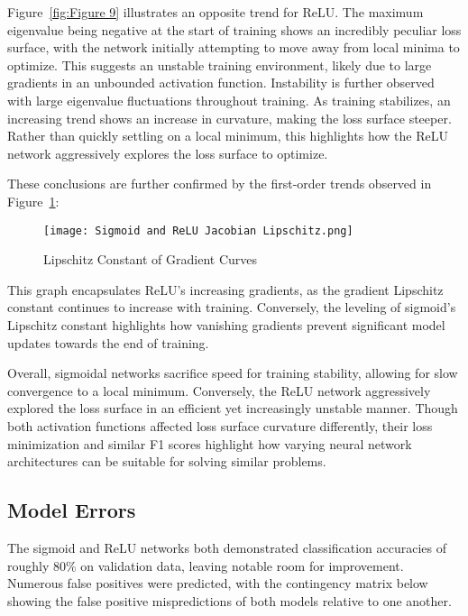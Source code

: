 \documentclass{article}
\theoremstyle{definition}
\begin{document}
Figure~\ref{fig:Figure 9} illustrates an opposite trend for ReLU. The maximum eigenvalue being negative at the start of training shows an incredibly peculiar loss surface, with the network initially attempting to move away from local minima to optimize. This suggests an unstable training environment, likely due to large gradients in an unbounded activation function. Instability is further observed with large eigenvalue fluctuations throughout training. As training stabilizes, an increasing trend shows an increase in curvature, making the loss surface steeper. Rather than quickly settling on a local minimum, this highlights how the ReLU network aggressively explores the loss surface to optimize. 

These conclusions are further confirmed by the first-order trends observed in Figure~\ref{fig:Figure 10}:
\begin{figure}[H]
    \centering
    \texttt{[image: Sigmoid and ReLU Jacobian Lipschitz.png]} %
    \caption{Lipschitz Constant of Gradient Curves}
    \label{fig:Figure 10}
\end{figure}
This graph encapsulates ReLU's increasing gradients, as the gradient Lipschitz constant continues to increase with training. Conversely, the leveling of sigmoid's Lipschitz constant highlights how vanishing gradients prevent significant model updates towards the end of training. 

Overall, sigmoidal networks sacrifice speed for training stability, allowing for slow convergence to a local minimum. Conversely, the ReLU network aggressively explored the loss surface in an efficient yet increasingly unstable manner. Though both activation functions affected loss surface curvature differently, their loss minimization and similar F1 scores highlight how varying neural network architectures can be suitable for solving similar problems.
\subsection{Model Errors}
The sigmoid and ReLU networks both demonstrated classification accuracies of roughly 80\% on validation data, leaving notable room for improvement. Numerous false positives were predicted, with the contingency matrix below showing the false positive mispredictions of both models relative to one another.

\end{document}

